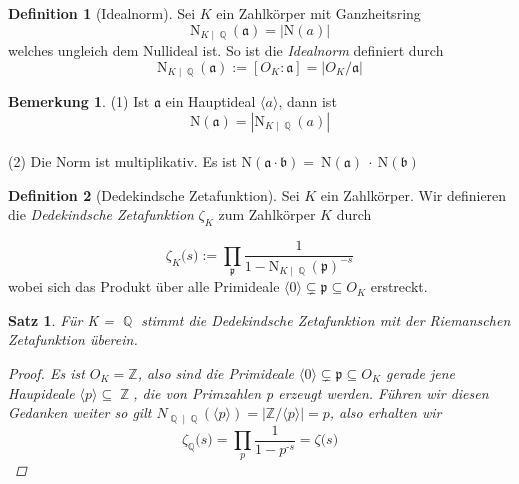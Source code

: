 \documentclass[10pt,a4paper]{article}
\theoremstyle{plain}
\newtheorem{satz}[thm]{Satz}
\theoremstyle{definition}
\newtheorem{defn}{Definition}[section]
\newtheorem*{note}{Bemerkung}
\theoremstyle{remark}
\DeclareMathOperator{\Q}{\mathbb{Q}}
\DeclareMathOperator{\Z}{\mathbb{Z}}
\begin{document}
\begin{defn}[Idealnorm]

Sei $\textit{K}$ ein Zahlkörper mit Ganzheitsring $$\mathrm{N}_{K \mid \Q}(\mathfrak{a}) = |\mathrm{N}(a)|$$ welches ungleich dem Nullideal ist. So ist die \textit{Idealnorm} definiert durch $$\mathrm{N}_{K \mid \Q}(\mathfrak{a}) := [O_{K} : \mathfrak{a} ] = \vert O_{K} / \mathfrak{a} \vert$$

\end{defn}

\begin{note}
(1) Ist $\mathfrak{a}$ ein Hauptideal $\langle a \rangle$, dann ist $$\mathrm{N}(\mathfrak{a}) = |\mathrm{N}_{K\mid \Q}(a)|$$
\\
(2) Die Norm ist multiplikativ. Es ist N$(\mathfrak{a}\cdot \mathfrak{b}) = \ $N$(\mathfrak{a})\ \cdot \ $N$(\mathfrak{b})$

\end{note}

\begin{defn}[Dedekindsche Zetafunktion]

Sei $\textit{K}$ ein Zahlkörper. Wir definieren die \textit{Dedekindsche Zetafunktion} \textit{$\zeta_{\textit{K}}$} zum Zahlkörper $\textit{K}$ durch
	
$$\zeta_{\textit{K}} \textit{(s)}:= \prod_{\mathfrak{p}}\frac{1}{1-\mathrm{N}_{K \mid \Q}(\mathfrak{p})^{-s}}$$
wobei sich das Produkt über alle Primideale $\langle0\rangle\subsetneq \mathfrak{p} \subseteq O_{\textit{K}}$ erstreckt. 
\end{defn}

\begin{satz}

Für \textit{K} = $\Q$ stimmt die Dedekindsche Zetafunktion mit der Riemanschen Zetafunktion überein.

\begin{proof}
Es ist $O_\textit{K} = \mathbb{Z}$, also sind die Primideale $\langle0\rangle\subsetneq \mathfrak{p} \subseteq O_{\textit{K}}$ gerade jene Haupideale $\langle \textit{p}\rangle\subseteq\Z$, die von Primzahlen \textit{p} erzeugt werden. Führen wir diesen Gedanken weiter so gilt $N_{\Q\mid\Q}(\langle \textit{p}\rangle) = | \mathbb{Z}/\langle \textit{p}\rangle| = \textit{p}$, also erhalten wir  $$\zeta_{\Q} \textit{(s)}= \prod_{\textit{p}} \frac{1}{1-\textit{p}^\textit{-s}} = \zeta \textit{(s)} $$

\end{proof}

\end{satz}
\end{document}
